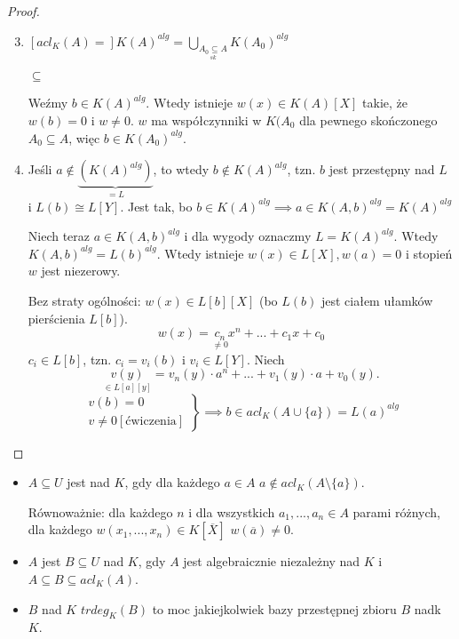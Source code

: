 \begin{proof}$ $

\begin{enumerate}
\setcounter{enumi}{2}
\item $[acl_K(A)=]K(A)^{alg}=\bigcup_{\underset{sk}{A_0\subseteq A}}K(A_0)^{alg}$

$\subseteq$

Weźmy $b\in K(A)^{alg}$. Wtedy istnieje $w(x)\in K(A)[X]$ takie, że $w(b)=0$ i $w\neq 0$. $w$ ma współczynniki w $K(A_0$ dla pewnego skończonego $A_0\subseteq A$, więc $b\in K(A_0)^{alg}$.

\item Jeśli $a\notin \underbrace{(K(A)^{alg})}_{=L}$, to wtedy $b\notin K(A)^{alg}$, tzn. $b$ jest przestępny nad $L$ i $L(b)\cong L[Y]$. Jest tak, bo $b\in K(A)^{alg}\implies a\in K(A, b)^{alg}=K(A)^{alg}$

Niech teraz $a\in K(A, b)^{alg}$ i dla wygody oznaczmy $L=K(A)^{alg}$. Wtedy $K(A,b)^{alg}=L(b)^{alg}$. Wtedy istnieje $w(x)\in L[X],w(a)=0$ i stopień $w$ jest niezerowy.

Bez straty ogólności: $w(x)\in L[b][X]$ (bo $L(b)$ jest ciałem ułamków pierścienia $L[b]$).
$$w(x)=\underset{\neq0}{c_n}x^n+...+c_1x+c_0$$
$c_i\in L[b]$, tzn. $c_i=v_i(b)$ i $v_i\in L[Y]$. Niech 
$$\underset{\in L[a][y]}{v(y)}=v_n(y)\cdot a^n+...+v_1(y)\cdot a+v_0(y).$$
$$\left.\begin{array}{l}v(b)=0\\v\neq 0 [\text{ćwiczenia}]\end{array}\right\}\implies b\in acl_K(A\cup\{a\})=L(a)^{alg}$$
\end{enumerate}
\end{proof}

\begin{bbox}
\begin{itemize}
    \item[\PHtunny] $A\subseteq U$ jest  nad $K$, gdy dla każdego $a\in A$ $a\notin acl_K(A\setminus\{a\})$.

    Równoważnie: dla każdego $n$ i dla wszystkich $a_1,...,a_n\in A$ parami różnych, dla każdego $w(x_1,...,x_n)\in K[\overline{X}]$ $w(\overline{a})\neq 0$.
    \item[\PHtunny] $A$ jest  $B\subseteq U$ nad $K$, gdy $A$ jest algebraicznie niezależny nad $K$ i $A\subseteq B\subseteq acl_K(A)$.
    \item[\PHtunny]  $B$ nad $K$ $trdeg_K(B)$ to moc jakiejkolwiek bazy przestępnej zbioru $B$ nadk $K$.
\end{itemize}
\end{bbox}

